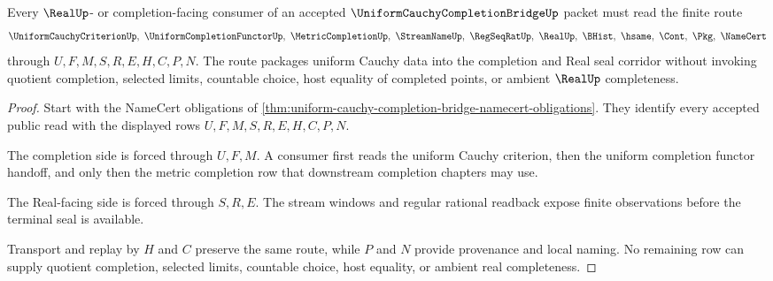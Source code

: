 \begin{theorem}
\label{thm:uniform-cauchy-completion-bridge-finite-route}
Every $\RealUp$- or completion-facing consumer of an accepted $\UniformCauchyCompletionBridgeUp$ packet must read the finite route
$$
\UniformCauchyCriterionUp,\ \UniformCompletionFunctorUp,\ \MetricCompletionUp,\ \StreamNameUp,\ \RegSeqRatUp,\ \RealUp,\ \BHist,\ \hsame,\ \Cont,\ \Pkg,\ \NameCert
$$
through $U,F,M,S,R,E,H,C,P,N$. The route packages uniform Cauchy data into the completion and Real seal corridor without invoking quotient completion, selected limits, countable choice, host equality of completed points, or ambient $\RealUp$ completeness.
\end{theorem}
\begin{proof}
Start with the NameCert obligations of \autoref{thm:uniform-cauchy-completion-bridge-namecert-obligations}. They identify every accepted public read with the displayed rows $U,F,M,S,R,E,H,C,P,N$.

The completion side is forced through $U,F,M$. A consumer first reads the uniform Cauchy criterion, then the uniform completion functor handoff, and only then the metric completion row that downstream completion chapters may use.

The Real-facing side is forced through $S,R,E$. The stream windows and regular rational readback expose finite observations before the terminal seal is available.

Transport and replay by $H$ and $C$ preserve the same route, while $P$ and $N$ provide provenance and local naming. No remaining row can supply quotient completion, selected limits, countable choice, host equality, or ambient real completeness.
\end{proof}



